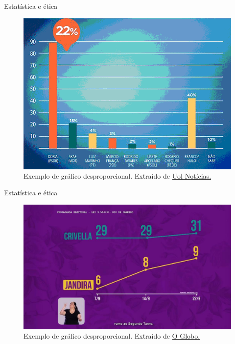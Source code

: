 \documentclass[
  ignorenonframetext,
  serif,
  professionalfont,
  usenames,
  dvipsnames,
  aspectratio = 169]{beamer}
\begin{document}
\begin{frame}{Estatística e ética}
\protect\hypertarget{estatuxedstica-e-uxe9tica-1}{}
\begin{figure}

{\centering \includegraphics[width=1\linewidth]{./img/grafico-desproporcional} 

}

\caption{Exemplo de gráfico desproporcional. Extraído de \href{https://noticias.uol.com.br/politica/eleicoes/2018/noticias/2018/05/30/psdb-sp-divulga-grafico-desproporcional-de-doria-e-tira-do-ar-apos-criticas.htm}{Uol Notícias.}}\label{fig:unnamed-chunk-8}
\end{figure}
\end{frame}

\begin{frame}{Estatística e ética}
\protect\hypertarget{estatuxedstica-e-uxe9tica-2}{}
\begin{figure}

{\centering \includegraphics[width=0.7\linewidth]{./img/grafico-desproporcional2} 

}

\caption{Exemplo de gráfico desproporcional. Extraído de \href{https://oglobo.globo.com/politica/no-rio-candidatos-recorrem-pedalada-grafica-para-maquiar-desempenho-20198224}{O Globo.}}\label{fig:unnamed-chunk-9}
\end{figure}
\end{frame}
\end{document}
